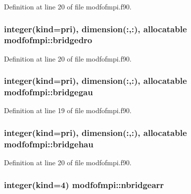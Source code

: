 Definition at line 20 of file modfofmpi.\+f90.

\subsubsection[{\texorpdfstring{bridgedro}{bridgedro}}]{\setlength{\rightskip}{0pt plus 5cm}integer(kind=pri), dimension(\+:,\+:), allocatable modfofmpi\+::bridgedro}\hypertarget{namespacemodfofmpi_a400402d1fc58970ecda00536a07c021c}{}\label{namespacemodfofmpi_a400402d1fc58970ecda00536a07c021c}


Definition at line 20 of file modfofmpi.\+f90.

\subsubsection[{\texorpdfstring{bridgegau}{bridgegau}}]{\setlength{\rightskip}{0pt plus 5cm}integer(kind=pri), dimension(\+:,\+:), allocatable modfofmpi\+::bridgegau}\hypertarget{namespacemodfofmpi_a157af8da53311980e23d05748e181a7f}{}\label{namespacemodfofmpi_a157af8da53311980e23d05748e181a7f}


Definition at line 19 of file modfofmpi.\+f90.

\subsubsection[{\texorpdfstring{bridgehau}{bridgehau}}]{\setlength{\rightskip}{0pt plus 5cm}integer(kind=pri), dimension(\+:,\+:), allocatable modfofmpi\+::bridgehau}\hypertarget{namespacemodfofmpi_a5a9577c42a1c3c53db8eb603945b530b}{}\label{namespacemodfofmpi_a5a9577c42a1c3c53db8eb603945b530b}


Definition at line 20 of file modfofmpi.\+f90.

\subsubsection[{\texorpdfstring{nbridgearr}{nbridgearr}}]{\setlength{\rightskip}{0pt plus 5cm}integer(kind=4) modfofmpi\+::nbridgearr}\hypertarget{namespacemodfofmpi_a887d577430624ed6c6e8952b089e0576}{}\label{namespacemodfofmpi_a887d577430624ed6c6e8952b089e0576}


